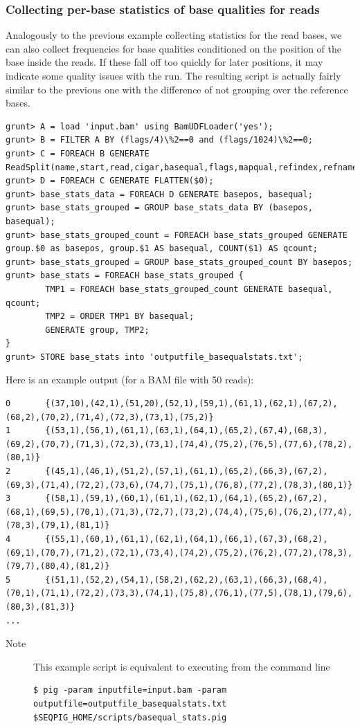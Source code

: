 \subsubsection{Collecting per-base statistics of base qualities for reads}
Analogously to the previous example collecting statistics for the read bases, we can also collect
frequencies for base qualities conditioned on the position of the base inside
the reads. If these fall off too quickly for later positions, it may
indicate some quality issues with the run. The resulting script is actually
fairly similar to the previous one with the difference of not grouping
over the reference bases.
\begin{lstlisting}
grunt> A = load 'input.bam' using BamUDFLoader('yes');
grunt> B = FILTER A BY (flags/4)\%2==0 and (flags/1024)\%2==0;
grunt> C = FOREACH B GENERATE ReadSplit(name,start,read,cigar,basequal,flags,mapqual,refindex,refname,attributes#'MD');
grunt> D = FOREACH C GENERATE FLATTEN($0);
grunt> base_stats_data = FOREACH D GENERATE basepos, basequal;
grunt> base_stats_grouped = GROUP base_stats_data BY (basepos, basequal);
grunt> base_stats_grouped_count = FOREACH base_stats_grouped GENERATE group.$0 as basepos, group.$1 AS basequal, COUNT($1) AS qcount;
grunt> base_stats_grouped = GROUP base_stats_grouped_count BY basepos;
grunt> base_stats = FOREACH base_stats_grouped {
        TMP1 = FOREACH base_stats_grouped_count GENERATE basequal, qcount;
        TMP2 = ORDER TMP1 BY basequal;
        GENERATE group, TMP2;
}
grunt> STORE base_stats into 'outputfile_basequalstats.txt';
\end{lstlisting}
Here is an example output (for a BAM file with 50 reads):
\begin{lstlisting}
0       {(37,10),(42,1),(51,20),(52,1),(59,1),(61,1),(62,1),(67,2),(68,2),(70,2),(71,4),(72,3),(73,1),(75,2)}
1       {(53,1),(56,1),(61,1),(63,1),(64,1),(65,2),(67,4),(68,3),(69,2),(70,7),(71,3),(72,3),(73,1),(74,4),(75,2),(76,5),(77,6),(78,2),(80,1)}
2       {(45,1),(46,1),(51,2),(57,1),(61,1),(65,2),(66,3),(67,2),(69,3),(71,4),(72,2),(73,6),(74,7),(75,1),(76,8),(77,2),(78,3),(80,1)}
3       {(58,1),(59,1),(60,1),(61,1),(62,1),(64,1),(65,2),(67,2),(68,1),(69,5),(70,1),(71,3),(72,7),(73,2),(74,4),(75,6),(76,2),(77,4),(78,3),(79,1),(81,1)}
4       {(55,1),(60,1),(61,1),(62,1),(64,1),(66,1),(67,3),(68,2),(69,1),(70,7),(71,2),(72,1),(73,4),(74,2),(75,2),(76,2),(77,2),(78,3),(79,7),(80,4),(81,2)}
5       {(51,1),(52,2),(54,1),(58,2),(62,2),(63,1),(66,3),(68,4),(70,1),(71,1),(72,2),(73,3),(74,1),(75,8),(76,1),(77,5),(78,1),(79,6),(80,3),(81,3)}
...
\end{lstlisting}
\begin{description}
	\item[Note] This example script is equivalent to executing from the command line
\begin{lstlisting}
$ pig -param inputfile=input.bam -param outputfile=outputfile_basequalstats.txt $SEQPIG_HOME/scripts/basequal_stats.pig
\end{lstlisting}
\end{description}

